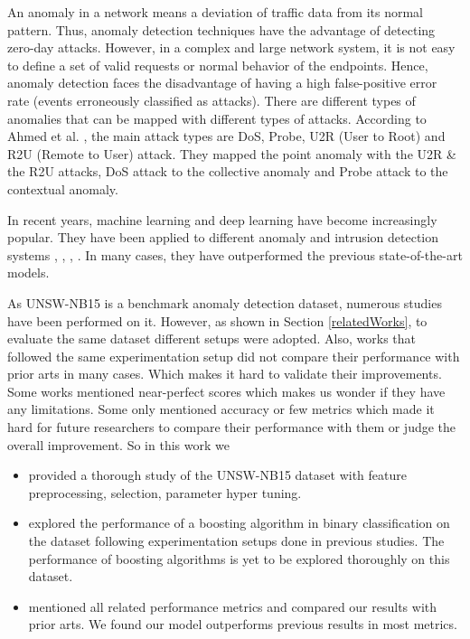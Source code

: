 \documentclass[14pt, conference]{IEEEtran}
\begin{document}
An anomaly in a network means a deviation of traffic data from its normal pattern. Thus, anomaly detection techniques
have the advantage of detecting zero-day attacks. However, in a complex and large network system,  it is not easy to
define a set of valid requests or normal behavior of the endpoints. Hence, anomaly detection faces the disadvantage of
having a high false-positive error rate (events erroneously classified as attacks). There are different types of
anomalies that can be mapped with different types of attacks. According to Ahmed et al. \cite{ahmed2016survey},
the main attack types are DoS, Probe, U2R (User to Root) and R2U (Remote to User) attack. They mapped the point
anomaly with the U2R \& the R2U attacks, DoS attack to the collective anomaly and Probe attack to the contextual anomaly.

In recent years, machine learning and deep learning have become increasingly popular. They have been applied to
different anomaly and intrusion detection systems \cite{kwon2017survey}, \cite{naseer2018enhanced},
\cite{fernandes2019comprehensive}, \cite{chalapathy2019deep}. In many cases, they have outperformed the previous
state-of-the-art models.

As UNSW-NB15\cite{moustafa2015unsw} is a benchmark anomaly detection dataset, numerous studies have been performed on it.
However, as shown in Section \ref{relatedWorks}, to evaluate the same dataset different setups were adopted.
Also, works that followed the same experimentation setup did not compare their performance with prior arts in many cases.
Which makes it hard to validate their improvements. Some works mentioned near-perfect scores which makes us wonder if
they have any limitations. Some only mentioned accuracy or few metrics which made it hard for future researchers to
compare their performance with them or judge the overall improvement. So in this work we

\begin{itemize}
    \item provided a thorough study of the UNSW-NB15 dataset with feature preprocessing, selection, parameter hyper tuning.
    \item explored the performance of a boosting algorithm in binary classification on the dataset following
    experimentation setups done in previous studies. The performance of boosting algorithms is yet to be explored
    thoroughly on this dataset.
    \item mentioned all related performance metrics and compared our results with prior arts. We found our model
    outperforms previous results in most metrics.
\end{itemize}
\end{document}

